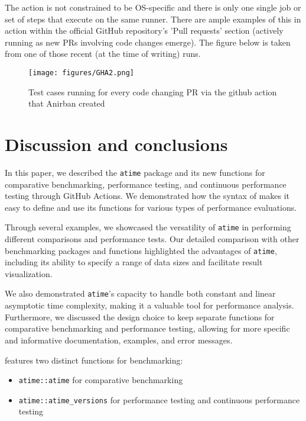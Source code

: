 The action is not constrained to be OS-specific and there is only one single job or set of steps that execute on the same runner.
\newline
\newline
There are ample examples of this in action within the official  GitHub repository's 'Pull requests' section (actively running as new PRs involving code changes emerge). The figure below is taken from one of those recent (at the time of writing) runs.

\begin{figure}[H]
    \centering
    \texttt{[image: figures/GHA2.png]}
    \caption{Test cases running for every code changing PR via the github action that Anirban created}
    \label{fig:label5}
\end{figure}

\section{Discussion and conclusions}

In this paper, we described the \texttt{atime} package and its new functions for comparative benchmarking, performance testing, and continuous performance testing through GitHub Actions. We demonstrated how the syntax of  makes it easy to define and use its functions for various types of performance evaluations.

Through several examples, we showcased the versatility of \texttt{atime} in performing different comparisons and performance tests. Our detailed comparison with other benchmarking packages and functions highlighted the advantages of \texttt{atime}, including its ability to specify a range of data sizes and facilitate result visualization.

We also demonstrated \texttt{atime}'s capacity to handle both constant and linear asymptotic time complexity, making it a valuable tool for performance analysis. Furthermore, we discussed the design choice to keep separate functions for comparative benchmarking and performance testing, allowing for more specific and informative documentation, examples, and error messages.

 features two distinct functions for benchmarking: 
\begin{itemize}

    \item\texttt{atime::atime} for comparative benchmarking 
    \item\texttt{atime::atime\_versions} for performance testing and continuous performance testing

\end{itemize}

